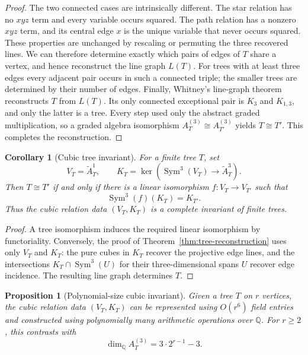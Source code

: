 \documentclass[11pt]{amsart}
\theoremstyle{plain}
\newtheorem{proposition}[theorem]{Proposition}
\newtheorem{corollary}[theorem]{Corollary}
\theoremstyle{definition}
\theoremstyle{remark}
\newcommand{\Q}{\mathbb{Q}}
\begin{document}
\begin{proof}
The two connected cases are intrinsically different.  The star relation has
no $xyz$ term and every variable occurs squared.  The path relation has a
nonzero $xyz$ term, and its central edge $x$ is the unique variable that never
occurs squared.  These properties are unchanged by rescaling or permuting the
three recovered lines.  We can therefore determine exactly which pairs of
edges of $T$ share a vertex, and hence reconstruct the line graph $L(T)$.
For trees with at least three edges every adjacent pair occurs in such a
connected triple; the smaller trees are determined by their number of edges.
Finally, Whitney's line-graph theorem \cite{Whitney} reconstructs $T$ from
$L(T)$.  Its only connected exceptional pair is $K_3$ and $K_{1,3}$, and only
the latter is a tree.  Every step used only the abstract graded multiplication,
so a graded algebra isomorphism $A_T^{(3)}\cong A_{T'}^{(3)}$ yields
$T\cong T'$.  This completes the reconstruction.
\end{proof}

\begin{corollary}[Cubic tree invariant]\label{cor:tree-cubic-invariant}
For a finite tree $T$, set
\[
  V_T=\widetilde A_T^1,
  \qquad
  K_T=\ker\!\left(
    \operatorname{Sym}^3(V_T)\longrightarrow \widetilde A_T^3
  \right).
\]
Then $T\cong T'$ if and only if there is a linear isomorphism
$f:V_T\to V_{T'}$ such that
\[
  \operatorname{Sym}^3(f)(K_T)=K_{T'}.
\]
Thus the cubic relation data $(V_T,K_T)$ is a complete invariant of finite
trees.
\end{corollary}

\begin{proof}
A tree isomorphism induces the required linear isomorphism by functoriality.
Conversely, the proof of Theorem~\ref{thm:tree-reconstruction} uses only
$V_T$ and $K_T$: the pure cubes in $K_T$ recover the projective edge lines,
and the intersections $K_T\cap\operatorname{Sym}^3(U)$ for their
three-dimensional spans $U$ recover edge incidence.  The resulting line graph
determines $T$.
\end{proof}

\begin{proposition}[Polynomial-size cubic invariant]
\label{prop:tree-cubic-polynomial-size}
Given a tree $T$ on $r$ vertices, the cubic relation data $(V_T,K_T)$ can be
represented using $O(r^6)$ field entries and constructed using polynomially
many arithmetic operations over $\Q$.  For $r\geq2$, this contrasts with
\[
  \dim_{\Q}A_T^{(3)}=3\cdot2^{r-1}-3.
\]
\end{proposition}
\end{document}
